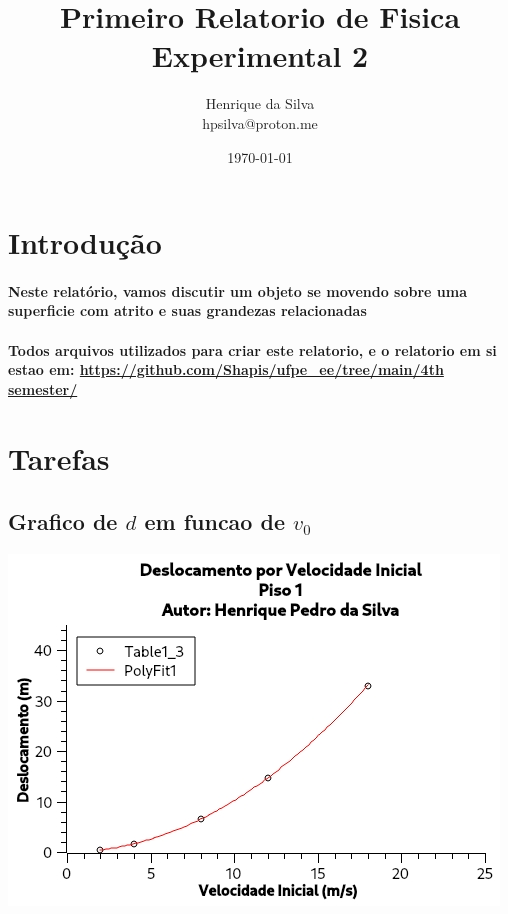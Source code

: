 \documentclass[12pt,twoside, a4paper, twocolumn]{article}
\title{Primeiro Relatorio de Fisica Experimental 2}
\author{Henrique da Silva \\ hpsilva@proton.me}
\date{\today}
\begin{document}
\maketitle
{}
\newpage
\tableofcontents
\newpage

\section{Introdução}

\paragraph*{Neste relatório, vamos discutir um objeto se movendo sobre uma superficie com atrito e suas grandezas relacionadas}

\paragraph*{Todos arquivos utilizados para criar este relatorio, e o relatorio em si estao em:  \url{https://github.com/Shapis/ufpe_ee/tree/main/4th semester/}}

\section{Tarefas}

\subsection{Grafico de $d$ em funcao de $v_0$}



\begin{adjustbox}{scale=0.75}
    \includegraphics{Grafico-0.jpg}
\end{adjustbox}
\end{document}
